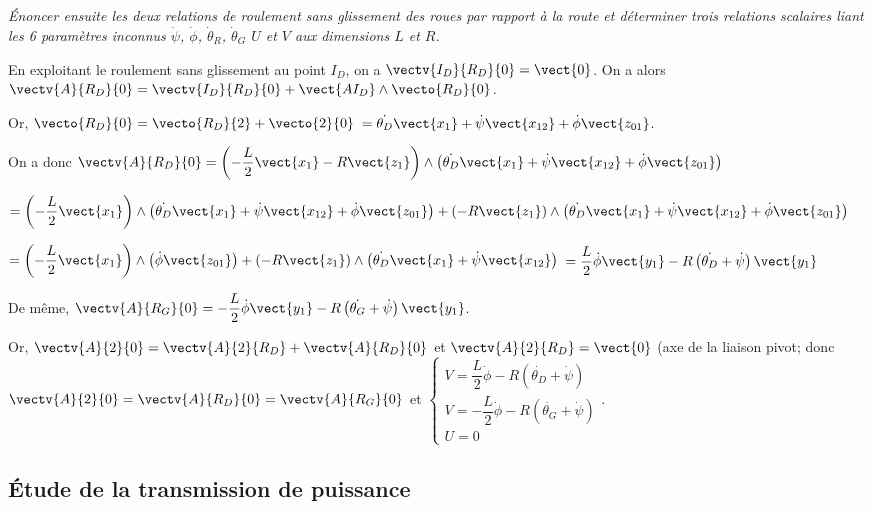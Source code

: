 \documentclass[10pt,fleqn]{article} %
\begin{document}
\subparagraph{\label{q_08}}\textit{\'Enoncer ensuite les deux relations de roulement sans glissement des roues par rapport à la route et déterminer trois relations scalaires liant les 6 paramètres inconnus $\dot{\psi}$, $\dot{\phi}$, $\dot{\theta}_R$, $\dot{\theta}_G$ $U$ et $V$ aux dimensions $L$ et $R$.}
\ifprof
\begin{corrige}
En exploitant le roulement sans glissement au point $I_D$, on a $\vectv{I_D}{R_D}{0}=\vect{0}$. 
On a alors $\vectv{A}{R_D}{0} = \vectv{I_D}{R_D}{0} + \vect{A I_D} \wedge \vecto{R_D}{0}$.

Or, $\vecto{R_D}{0}= \vecto{R_D}{2}+\vecto{2}{0}$ $=\dot{\theta_D}\vect{x_1}+\dot{\psi}\vect{x_{12}}+\dot{\phi}\vect{z_{01}}$.

On a donc 
$\vectv{A}{R_D}{0} = \left(-\dfrac{L}{2}\vect{x_1}-R\vect{z_1}\right)\wedge \left(\dot{\theta_D}\vect{x_1}+\dot{\psi}\vect{x_{12}}+\dot{\phi}\vect{z_{01}}\right)$

$=\left(-\dfrac{L}{2}\vect{x_1}\right)\wedge \left(\dot{\theta_D}\vect{x_1}+\dot{\psi}\vect{x_{12}}+\dot{\phi}\vect{z_{01}}\right)+\left(-R\vect{z_1}\right)\wedge \left(\dot{\theta_D}\vect{x_1}+\dot{\psi}\vect{x_{12}}+\dot{\phi}\vect{z_{01}}\right)$

$=\left(-\dfrac{L}{2}\vect{x_1}\right)\wedge \left(\dot{\phi}\vect{z_{01}}\right)+\left(-R\vect{z_1}\right)\wedge \left(\dot{\theta_D}\vect{x_1}+\dot{\psi}\vect{x_{12}}\right)$
$=\dfrac{L}{2}\dot{\phi}\vect{y_{1}}-R\left(\dot{\theta_D}+\dot{\psi}\right)\vect{y_1}$

De même, $\vectv{A}{R_G}{0}=-\dfrac{L}{2}\dot{\phi}\vect{y_{1}}-R\left(\dot{\theta_G}+\dot{\psi}\right)\vect{y_1}$.


Or, $\vectv{A}{2}{0} = \vectv{A}{2}{R_D} + \vectv{A}{R_D}{0}$ et $\vectv{A}{2}{R_D} = \vect{0}$ (axe de la liaison pivot; donc $\vectv{A}{2}{0} = \vectv{A}{R_D}{0} = \vectv{A}{R_G}{0}$ et 
$
\left\{
\begin{array}{l}
V = \dfrac{L}{2}\dot{\phi}-R\left(\dot{\theta_D}+\dot{\psi}\right) \\
V = -\dfrac{L}{2}\dot{\phi}-R\left(\dot{\theta_G}+\dot{\psi}\right) \\
U = 0
\end{array}
\right.
$.
\end{corrige}
\else
\fi

\subsection{\'Etude de la transmission de puissance}
\ifprof
\else
\end{document}
